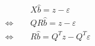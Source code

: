 \documentclass[10pt]{article}
\begin{document}
\begin{align*}\begin{split}
& \phantom{+} X\hat{b} = z - \varepsilon \\
\Leftrightarrow & \phantom{+} Q R \hat{b} = z - \varepsilon \\
\Leftrightarrow & \phantom{+} R \hat{b} = Q^T z - Q^T \varepsilon \\
\end{split}\end{align*}
\end{document}
